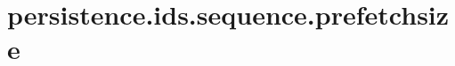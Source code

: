 \section{persistence.ids.sequence.prefetchsize}
\label{configuration:PersistenceIdsSequencePrefetchsize}
\AvailableInJavaOnly{\TODO}